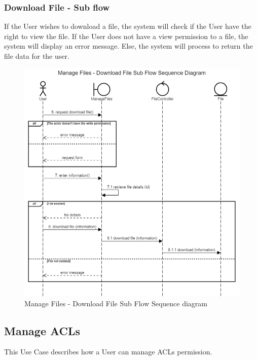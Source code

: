 \subsubsection{Download File - Sub flow}
If the User wishes to download a file, the system will check if the User have the right to view the file. If the User does not have a view permission to a file, the system will display an error message. Else, the system will process to return the file data for the user.  
\begin{figure}[H]
    \centering
    \includegraphics[width=1.0\textwidth]{images/Manage Files - Download File Sub Flow Sequence Diagram.png}
    \caption{Manage Files - Download File Sub Flow Sequence diagram}
    \label{fig:SeqFilesDownload}
\end{figure}

\subsection{Manage ACLs}
This Use Case describes how a User can manage ACLs permission.
